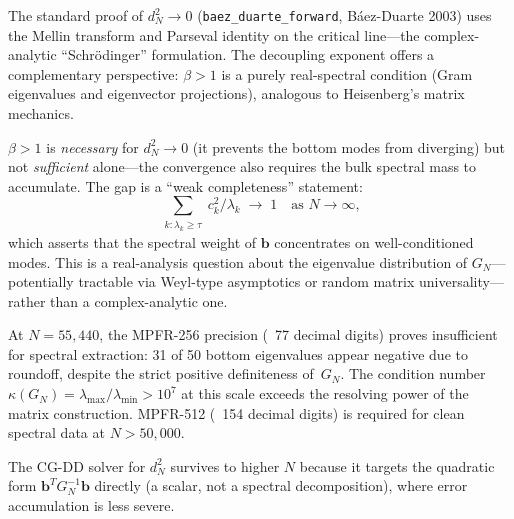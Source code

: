 \begin{remark}
The standard proof of $d_N^2 \to 0$ (\texttt{baez\_duarte\_forward},
B\'aez-Duarte 2003) uses the Mellin transform and Parseval identity on
the critical line---the complex-analytic ``Schr\"odinger'' formulation.
The decoupling exponent offers a complementary perspective: $\beta > 1$
is a purely real-spectral condition (Gram eigenvalues and eigenvector
projections), analogous to Heisenberg's matrix mechanics.

$\beta > 1$ is \emph{necessary} for $d_N^2 \to 0$ (it prevents the
bottom modes from diverging) but not \emph{sufficient} alone---the
convergence also requires the bulk spectral mass to accumulate.
The gap is a ``weak completeness'' statement:
\[
  \sum_{\substack{k : \lambda_k \geq \tau}} c_k^2 / \lambda_k
  \;\to\; 1 \quad \text{as } N \to \infty,
\]
which asserts that the spectral weight of $\mathbf{b}$ concentrates
on well-conditioned modes. This is a real-analysis question about
the eigenvalue distribution of $G_N$---potentially tractable via
Weyl-type asymptotics or random matrix universality---rather than
a complex-analytic one.
\end{remark}

\begin{remark}
At $N = 55{,}440$, the MPFR-256 precision (~77 decimal digits) proves
insufficient for spectral extraction: 31 of 50 bottom eigenvalues
appear negative due to roundoff, despite the strict positive
definiteness of~$G_N$. The condition number
$\kappa(G_N) = \lambda_{\max}/\lambda_{\min} > 10^7$ at this scale
exceeds the resolving power of the matrix construction.
MPFR-512 (~154 decimal digits) is required for clean spectral data
at $N > 50{,}000$.

The CG-DD solver for $d_N^2$ survives to higher $N$ because it targets
the quadratic form $\mathbf{b}^T G_N^{-1} \mathbf{b}$ directly
(a scalar, not a spectral decomposition), where error accumulation
is less severe.
\end{remark}

